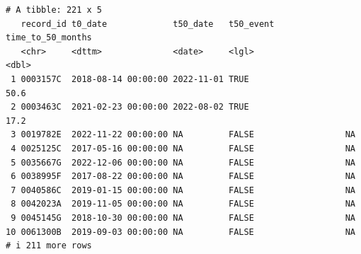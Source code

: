 \documentclass[
]{article}
\newenvironment{Shaded}{\begin{snugshade}}{\end{snugshade}}
\newcommand{\AttributeTok}[1]{\textcolor[rgb]{0.40,0.45,0.13}{#1}}
\newcommand{\CommentTok}[1]{\textcolor[rgb]{0.37,0.37,0.37}{#1}}
\newcommand{\ConstantTok}[1]{\textcolor[rgb]{0.56,0.35,0.01}{#1}}
\newcommand{\DecValTok}[1]{\textcolor[rgb]{0.68,0.00,0.00}{#1}}
\newcommand{\FunctionTok}[1]{\textcolor[rgb]{0.28,0.35,0.67}{#1}}
\newcommand{\NormalTok}[1]{\textcolor[rgb]{0.00,0.23,0.31}{#1}}
\newcommand{\OtherTok}[1]{\textcolor[rgb]{0.00,0.23,0.31}{#1}}
\newcommand{\SpecialCharTok}[1]{\textcolor[rgb]{0.37,0.37,0.37}{#1}}
\newcommand{\StringTok}[1]{\textcolor[rgb]{0.13,0.47,0.30}{#1}}
\begin{document}
\begin{verbatim}
# A tibble: 221 x 5
   record_id t0_date             t50_date   t50_event time_to_50_months
   <chr>     <dttm>              <date>     <lgl>                 <dbl>
 1 0003157C  2018-08-14 00:00:00 2022-11-01 TRUE                   50.6
 2 0003463C  2021-02-23 00:00:00 2022-08-02 TRUE                   17.2
 3 0019782E  2022-11-22 00:00:00 NA         FALSE                  NA  
 4 0025125C  2017-05-16 00:00:00 NA         FALSE                  NA  
 5 0035667G  2022-12-06 00:00:00 NA         FALSE                  NA  
 6 0038995F  2017-08-22 00:00:00 NA         FALSE                  NA  
 7 0040586C  2019-01-15 00:00:00 NA         FALSE                  NA  
 8 0042023A  2019-11-05 00:00:00 NA         FALSE                  NA  
 9 0045145G  2018-10-30 00:00:00 NA         FALSE                  NA  
10 0061300B  2019-09-03 00:00:00 NA         FALSE                  NA  
# i 211 more rows
\end{verbatim}

\begin{Shaded}
\end{Shaded}
\end{document}
